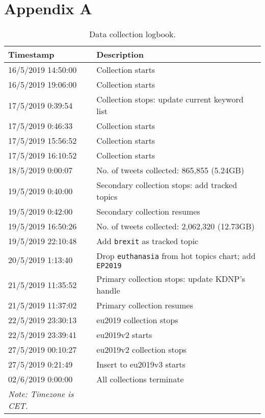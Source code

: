 \section{Appendix A}\label{appendix-a}\thispagestyle{SectionFirstPage} %
\setcounter{figure}{0}
\setcounter{table}{0}
%
%
\begin{table}[!htbp]
  \footnotesize
  \centering
  \caption{Data collection logbook.}\label{logbook}
  \begin{tabular}{ l l }
  \hline
  Timestamp & Description\\
  \hline
  16/5/2019 14:50:00 & Collection starts\\
  16/5/2019 19:06:00 & Collection starts\\
  17/5/2019 0:39:54 & Collection stops: update current keyword list\\
  17/5/2019 0:46:33 & Collection starts\\
  17/5/2019 15:56:52 & Collection starts\\
  17/5/2019 16:10:52 & Collection starts\\
  18/5/2019 0:00:07 & No. of tweets collected: 865,855 (5.24GB)\\
  19/5/2019 0:40:00 & Secondary collection stops: add tracked topics\\
  19/5/2019 0:42:00 & Secondary collection resumes\\
  19/5/2019 16:50:26 & No. of tweets collected: 2,062,320 (12.73GB)\\
  19/5/2019 22:10:48 & Add \texttt{brexit} as tracked topic\\
  20/5/2019 1:13:40 & Drop \texttt{euthanasia} from hot topics chart; add \texttt{EP2019}\\
  21/5/2019 11:35:52 & Primary collection stops: update KDNP's handle\\
  21/5/2019 11:37:02 & Primary collection resumes\\
  22/5/2019 23:30:13 & eu2019 collection stops\\
  22/5/2019 23:39:41 & eu2019v2 starts\\
  27/5/2019 00:10:27 & eu2019v2 collection stops\\
  27/5/2019 0:21:49 & Insert to eu2019v3 starts\\
  02/6/2019 0:00:00 & All collections terminate\\
  \hline
  \textit{Note: Timezone is CET.}
  \end{tabular}
\end{table}

